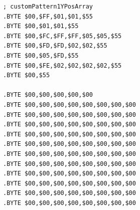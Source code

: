 \begin{minipage}[b]{0.33\linewidth}
\begin{lrbox}{\mybox}
\begin{lstlisting}[basicstyle=\ttfamily\tiny]
; customPattern1YPosArray
.BYTE $00,$FF,$01,$01,$55
.BYTE $00,$01,$01,$55
.BYTE $00,$FC,$FF,$FF,$05,$05,$55
.BYTE $00,$FD,$FD,$02,$02,$55
.BYTE $00,$05,$FD,$55
.BYTE $00,$FE,$02,$02,$02,$02,$55
.BYTE $00,$55

.BYTE $00,$00,$00,$00,$00
.BYTE $00,$00,$00,$00,$00,$00,$00,$00
.BYTE $00,$00,$00,$00,$00,$00,$00,$00
.BYTE $00,$00,$00,$00,$00,$00,$00,$00
.BYTE $00,$00,$00,$00,$00,$00,$00,$00
.BYTE $00,$00,$00,$00,$00,$00,$00,$00
.BYTE $00,$00,$00,$00,$00,$00,$00,$00
.BYTE $00,$00,$00,$00,$00,$00,$00,$00
.BYTE $00,$00,$00,$00,$00,$00,$00,$00
.BYTE $00,$00,$00,$00,$00,$00,$00,$00
.BYTE $00,$00,$00,$00,$00,$00,$00,$00
.BYTE $00,$00,$00,$00,$00,$00,$00,$00

\end{lstlisting}
\end{lrbox}%
\scalebox{0.8}{\usebox{\mybox}}
\end{minipage}
